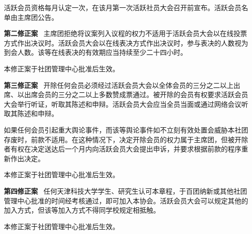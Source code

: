 \documentclass{gbt9704}
\begin{document}
活跃会员资格每月认定一次，在该月第一次活跃社员大会召开前宣布。活跃会员名单由主席团公告。

\textbf{第二修正案}~ 主席团拒绝将议案列入议程的权力不适用于活跃会员大会以在线投票方式作出决议时。活跃会员大会以在线表决方式作出决议时，参与表决的人数视为到会人数。该等在线表决的有效期应当持续至少二十四小时。

本修正案于社团管理中心批准后生效。

\textbf{第三修正案}~ 开除任何会员必须经过活跃会员大会以全体会员的三分之二以上出席、以出席会员的三分之二以上多数赞成票通过。被开除的会员有权要求活跃会员大会举行听证，听取其陈述和申辩。活跃会员大会应当全员当面或通过网络会议听取其陈述和申辩。

如果任何会员引起重大舆论事件，而该等舆论事件如不立刻有效处置会威胁本社团存废时，前款不适用。在这种情况下，决定开除会员的权力属于主席团，但被开除者有权在决定送达后一个月内向活跃会员大会提出申诉，并要求根据前款的程序重新作出决定。

本修正案于社团管理中心批准后生效。

\textbf{第四修正案}~ 任何天津科技大学学生、研究生认可本章程，于百团纳新或其他社团管理中心批准的时间经考核通过，即可加入本协会。活跃会员大会可以规定其他的加入方式，但该等加入方式不得同学校规定相抵触。

本修正案于社团管理中心批准后生效。
\end{document}
